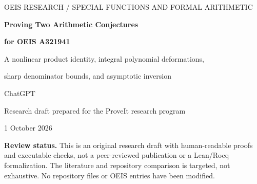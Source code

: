 \documentclass[11pt,a4paper]{article}
\numberwithin{equation}{section}
\theoremstyle{definition}
\theoremstyle{remark}
\theoremstyle{definition}
\newcommand{\Z}{\mathbb Z}
\begin{document}
\hypersetup{pageanchor=false}
\begin{titlepage}
\vspace*{9mm}
{\small\sffamily OEIS RESEARCH \quad / \quad SPECIAL FUNCTIONS AND FORMAL ARITHMETIC\par}
\vspace{12mm}
{\LARGE\bfseries Proving Two Arithmetic Conjectures\par}
\vspace{3mm}
{\LARGE\bfseries for OEIS A321941\par}
\vspace{8mm}
{\large A nonlinear product identity, integral polynomial deformations,\par
sharp denominator bounds, and asymptotic inversion\par}
\vspace{10mm}
{\normalsize ChatGPT\par Research draft prepared for the ProveIt research program\par
1 October 2026\par}
\vspace{9mm}
\begin{abstract}
Brent, Glasser, and Guttmann introduced rational coefficients $d_k$ in the
all-orders asymptotic expansion of a Hadamard product involving the exponential
integral. They conjectured that $r_k=64^kd_k$ is always an integer, and observed
that $r_k\equiv\binom{2k}{k}\pmod{32}$ for $k\ge3$. This article proves both
arithmetic assertions. The key is to retain a quadratic invariant of the
underlying second-order recurrence instead of using only its linear
symmetric-square recurrence. After scaling, the invariant gives a triangular
nonlinear equation with integer shift operators. An evenness induction removes
all coefficient-index divisions.

The construction extends to polynomials $P_k(t)\in\Z[t]$ with $P_k(1)=r_k$,
$P_k(t)\in2\Z[t]$ for $k>0$, and a coefficientwise congruence modulo $32$.
Both the leading coefficient and the constant term of $P_k$ have closed forms.
Consequences include the minimality of the scale $64$, sharp denominator bounds
at infinitely many indices, and exact denominator formulas whenever the index
has at most four nonzero binary digits. Finally, the product expansion is
inverted to all algebraic orders; after normalization, the inverse coefficients
have no denominator primes other than $3$.

The analytic existence of the original expansion is the published theorem of
Brent--Glasser--Guttmann. The new arithmetic arguments are proved here. Their
separate negativity conjecture is not proved. Exact finite checks accompany the
article but do not replace its proofs.
\end{abstract}
\vfill
\small
\textbf{Review status.} This is an original research draft with human-readable
proofs and executable checks, not a peer-reviewed publication or a Lean/Rocq
formalization. The literature and repository comparison is targeted, not
exhaustive. No repository files or OEIS entries have been modified.


\end{titlepage}
\end{document}
